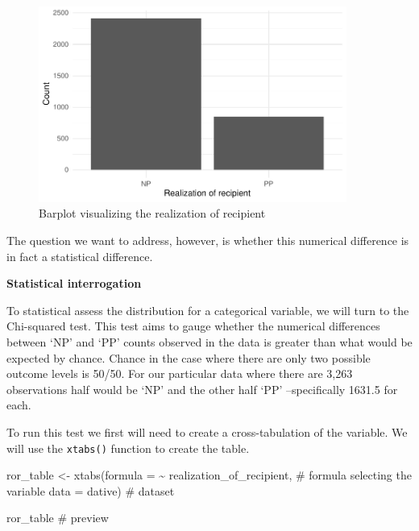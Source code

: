 \documentclass[
  letterpaper,
]{latex/krantz}
\newenvironment{Shaded}{\begin{snugshade}}{\end{snugshade}}
\newcommand{\AttributeTok}[1]{\textcolor[rgb]{0.40,0.45,0.13}{#1}}
\newcommand{\CommentTok}[1]{\textcolor[rgb]{0.37,0.37,0.37}{#1}}
\newcommand{\FunctionTok}[1]{\textcolor[rgb]{0.28,0.35,0.67}{#1}}
\newcommand{\NormalTok}[1]{\textcolor[rgb]{0.00,0.23,0.31}{#1}}
\newcommand{\OtherTok}[1]{\textcolor[rgb]{0.00,0.23,0.31}{#1}}
\newcommand{\SpecialCharTok}[1]{\textcolor[rgb]{0.37,0.37,0.37}{#1}}
\begin{document}
\begin{figure}[H]

{\centering \includegraphics[width=0.9\textwidth,height=\textheight]{./inference_files/figure-pdf/figi-uni-cat-visual-dative-1.pdf}

}

\caption{Barplot visualizing the realization of recipient}

\end{figure}

The question we want to address, however, is whether this numerical
difference is in fact a statistical difference.

\textbf{Statistical interrogation}

To statistical assess the distribution for a categorical variable, we
will turn to the Chi-squared test. This test aims to gauge whether the
numerical differences between `NP' and `PP' counts observed in the data
is greater than what would be expected by chance. Chance in the case
where there are only two possible outcome levels is 50/50. For our
particular data where there are 3,263 observations half would be `NP'
and the other half `PP' --specifically 1631.5 for each.

To run this test we first will need to create a cross-tabulation of the
variable. We will use the \texttt{xtabs()} function to create the table.

\begin{Shaded}
\begin{Highlighting}[]
\NormalTok{ror\_table }\OtherTok{\textless{}{-}} 
  \FunctionTok{xtabs}\NormalTok{(}\AttributeTok{formula =} \SpecialCharTok{\textasciitilde{}}\NormalTok{ realization\_of\_recipient, }\CommentTok{\# formula selecting the variable}
        \AttributeTok{data =}\NormalTok{ dative) }\CommentTok{\# dataset}

\NormalTok{ror\_table }\CommentTok{\# preview}
\end{Highlighting}
\end{Shaded}
\end{document}
